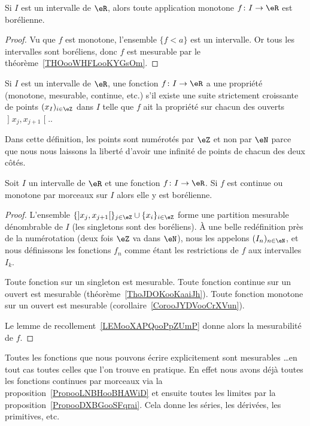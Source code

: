 \begin{corollary}       \label{CorooJYDVooCrXVun}
    Si \( I\) est un intervalle de \( \eR\), alors toute application monotone \( f\colon I\to \eR\) est borélienne.
\end{corollary}

\begin{proof}
    Vu que \( f\) est monotone, l'ensemble \( \{ f<a \}\) est un intervalle. Or tous les intervalles sont boréliens, donc \( f\) est mesurable par le théorème~\ref{THOooWHFLooKYGsOm}.
\end{proof}

\begin{definition}
Si \( I\) est un intervalle de \( \eR\), une fonction \( f\colon I\to \eR\) a une propriété (monotone, mesurable, continue, etc.)  s'il existe une suite strictement croissante de points \( (x_I)_{i\in \eZ}\) dans \( I\) telle que \( f\) ait la propriété sur chacun des ouverts \( \mathopen] x_j ,x_{j+1} \mathclose[.\).
\end{definition}
Dans cette définition, les points sont numérotés par \( \eZ\) et non par \( \eN\) parce que nous nous laissons la liberté d'avoir une infinité de points de chacun des deux côtés.

\begin{proposition}     \label{PropooLNBHooBHAWiD}
    Soit \( I\) un intervalle de \( \eR\) et une fonction \( f\colon I\to \eR\). Si \( f\) est continue ou monotone par morceaux sur \( I\) alors elle y est borélienne.
\end{proposition}

\begin{proof}
L'ensemble \( \{  \mathopen] x_j , x_{j+1} \mathclose[  \}_{j\in \eZ}\cup\{ x_i \}_{i\in \eZ}\) forme une partition mesurable dénombrable de \( I\) (les singletons sont des boréliens). À une belle redéfinition près de la numérotation (deux fois \( \eZ\) va dans \( \eN\)), nous les appelons \( (I_n)_{n\in \eN}\), et nous définissons les fonctions \( f_n\) comme étant les restrictions de \( f\) aux intervalles \( I_k\).

    Toute fonction sur un singleton est mesurable. Toute fonction continue sur un ouvert est mesurable (théorème~\ref{ThoJDOKooKaaiJh}). Toute fonction monotone sur un ouvert est mesurable (corollaire~\ref{CorooJYDVooCrXVun}).

    Le lemme de recollement~\ref{LEMooXAPQooPpZUmP} donne alors la mesurabilité de \( f\).
\end{proof}

\begin{normaltext}
    Toutes les fonctions que nous pouvons écrire explicitement sont mesurables \ldots en tout cas toutes celles que l'on trouve en pratique. En effet nous avons déjà toutes les fonctions continues par morceaux via la proposition~\ref{PropooLNBHooBHAWiD} et ensuite toutes les limites par la proposition~\ref{PropooDXBGooSFqrai}. Cela donne les séries, les dérivées, les primitives, etc.
\end{normaltext}
